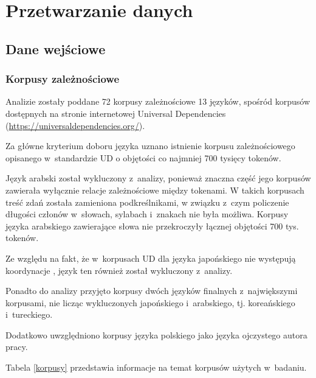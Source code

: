 \chapter{Przetwarzanie danych} \label{ch4}
\section{Dane wejściowe}
\subsection{Korpusy zależnościowe}

Analizie zostały poddane 72 korpusy zależnościowe 13 języków, spośród korpusów dostępnych na stronie internetowej Universal Dependencies (\url{https://universaldependencies.org/}).

Za główne kryterium doboru języka uznano istnienie korpusu zależnościowego opisanego w~standardzie UD o objętości co najmniej 700 tysięcy tokenów.  

Język arabski został wykluczony z~analizy, ponieważ znaczna część jego korpusów zawierała wyłącznie relacje zależnościowe między tokenami. W takich korpusach treść zdań została zamieniona podkreślnikami, w związku z~czym policzenie długości członów w~słowach, sylabach i~znakach nie była możliwa.  Korpusy języka arabskiego zawierające słowa nie przekroczyły łącznej objętości 700 tys. tokenów.

Ze względu na fakt, że w~korpusach UD dla języka japońskiego nie występują koordynacje \citep[s. 79]{kanayama2018coordinate}, język ten również został wykluczony z~analizy.

Ponadto do analizy przyjęto korpusy dwóch języków finalnych z~największymi korpusami, nie licząc wykluczonych japońskiego i~arabskiego, tj. koreańskiego i~tureckiego.

Dodatkowo uwzględniono korpusy języka polskiego jako języka ojczystego autora pracy. 

Tabela \ref{korpusy} przedstawia informacje na temat korpusów użytych w~badaniu.

\newpage

